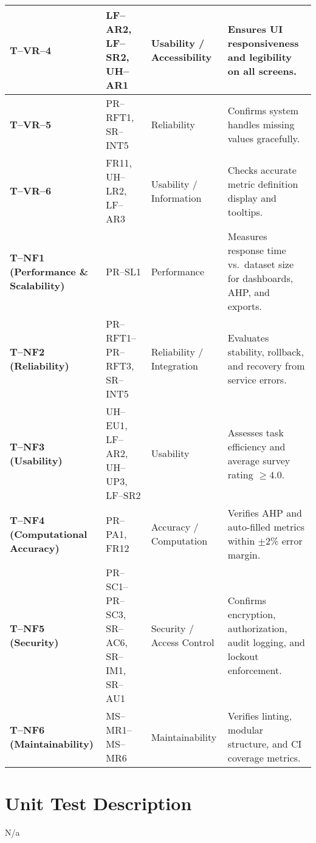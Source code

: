 \documentclass[12pt, titlepage]{article}
\begin{document}
\begin{longtable}{|p{}|p{}|p{}|p{}|}
\hline
\textbf{T--VR--4} & LF--AR2, LF--SR2, UH--AR1 & Usability / Accessibility & Ensures UI responsiveness and legibility on all screens. \\
\hline
\textbf{T--VR--5} & PR--RFT1, SR--INT5 & Reliability & Confirms system handles missing values gracefully. \\
\hline
\textbf{T--VR--6} & FR11, UH--LR2, LF--AR3 & Usability / Information & Checks accurate metric definition display and tooltips. \\
\hline
\textbf{T--NF1 (Performance \& Scalability)} & PR--SL1 & Performance & Measures response time vs.\ dataset size for dashboards, AHP, and exports. \\
\hline
\textbf{T--NF2 (Reliability)} & PR--RFT1--PR--RFT3, SR--INT5 & Reliability / Integration & Evaluates stability, rollback, and recovery from service errors. \\
\hline
\textbf{T--NF3 (Usability)} & UH--EU1, LF--AR2, UH--UP3, LF--SR2 & Usability & Assesses task efficiency and average survey rating $\geq 4.0$. \\
\hline
\textbf{T--NF4 (Computational Accuracy)} & PR--PA1, FR12 & Accuracy / Computation & Verifies AHP and auto-filled metrics within $\pm2$\% error margin. \\
\hline
\textbf{T--NF5 (Security)} & PR--SC1--PR--SC3, SR--AC6, SR--IM1, SR--AU1 & Security / Access Control & Confirms encryption, authorization, audit logging, and lockout enforcement. \\
\hline
\textbf{T--NF6 (Maintainability)} & MS--MR1--MS--MR6 & Maintainability & Verifies linting, modular structure, and CI coverage metrics. \\
\hline

\end{longtable}


\section{Unit Test Description}
N/a


\end{document}
